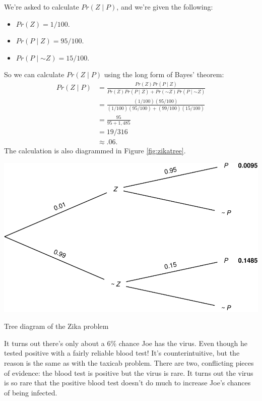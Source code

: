 \documentclass[justified]{tufte-book}
\providecommand{\tightlist}{%
  \setlength{\itemsep}{0pt}\setlength{\parskip}{0pt}}
\newcommand{\given}{\mid}
\renewcommand{\neg}{\mathbin{\sim}}
\newcommand{\p}{Pr}
\theoremstyle{definition}
\theoremstyle{definition}
\theoremstyle{definition}
\theoremstyle{remark}
\begin{document}
We're asked to calculate \(\p(Z \given P)\), and we're given the
following:

\begin{itemize}
\tightlist
\item
  \(\p(Z) = 1/100\).
\item
  \(\p(P \given Z) = 95/100\).
\item
  \(\p(P \given \neg Z) = 15/100\).
\end{itemize}

So we can calculate \(\p(Z \given P)\) using the long form of Bayes'
theorem: \[
  \begin{aligned}
    \p(Z \given P) &= \frac{\p(Z)\p(P \given Z)}{\p(Z)\p(P \given Z) + \p(\neg Z)\p(P \given \neg Z)}\\
                   &= \frac{(1/100)(95/100)}{(1/100)(95/100) + (99/100)(15/100)}\\
                   &= \frac{95}{95 + 1,485}\\
                   &= 19/316\\
                   &\approx .06.
  \end{aligned}
\] The calculation is also diagrammed in Figure \ref{fig:zikatree}.

\begin{marginfigure}
\includegraphics{_main_files/figure-latex/zikatree-1} \caption[Tree diagram of the Zika problem]{Tree diagram of the Zika problem}\label{fig:zikatree}
\end{marginfigure}

It turns out there's only about a \(6\%\) chance Joe has the virus. Even
though he tested positive with a fairly reliable blood test! It's
counterintuitive, but the reason is the same as with the taxicab
problem. There are two, conflicting pieces of evidence: the blood test
is positive but the virus is rare. It turns out the virus is so rare
that the positive blood test doesn't do much to increase Joe's chances
of being infected.
\end{document}
